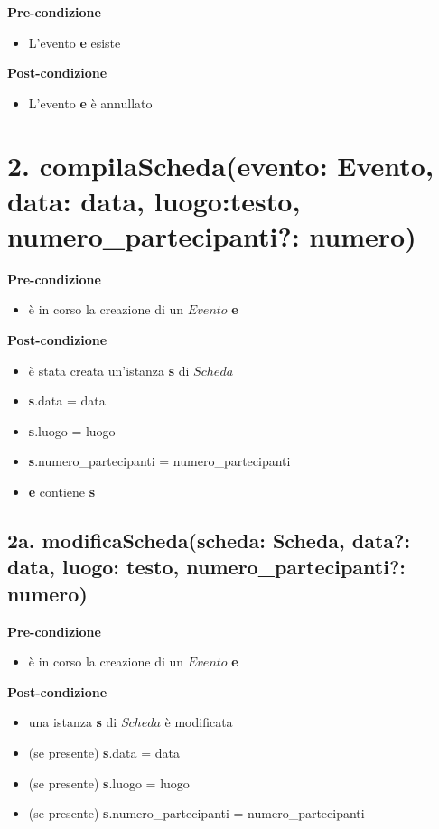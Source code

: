 \documentclass[12pt]{extarticle}
\begin{document}
\textbf{Pre-condizione}
\begin{itemize}
  \item L'evento \textbf{e} esiste
\end{itemize}
\textbf{Post-condizione}
\begin{itemize}
  \item L'evento \textbf{e} è annullato
\end{itemize}


\section*{2. compilaScheda(evento: Evento, data: data, luogo:testo, numero\_partecipanti?: numero)}

\textbf{Pre-condizione}
\begin{itemize}
  \item è in corso la creazione di un $Evento$ \textbf{e}
\end{itemize} 
\textbf{Post-condizione} 
\begin{itemize}
  \item è stata creata un'istanza \textbf{s} di $Scheda$
  \item \textbf{s}.data = data
  \item \textbf{s}.luogo = luogo
  \item \textbf{s}.numero\_partecipanti = numero\_partecipanti
  \item \textbf{e} contiene \textbf{s}
\end{itemize}

\subsection*{2a. modificaScheda(scheda: Scheda, data?: data, luogo: testo, numero\_partecipanti?: numero)}

\textbf{Pre-condizione}
\begin{itemize}
  \item è in corso la creazione di un $Evento$ \textbf{e}
\end{itemize} 
\textbf{Post-condizione}
\begin{itemize}
  \item una istanza \textbf{s} di $Scheda$ è modificata
  \item (se presente) \textbf{s}.data = data
  \item (se presente) \textbf{s}.luogo = luogo
  \item (se presente) \textbf{s}.numero\_partecipanti = numero\_partecipanti
\end{itemize} 
\end{document}

